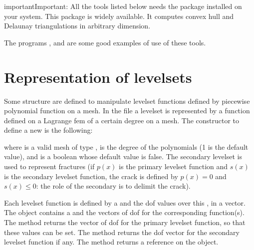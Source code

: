 \documentclass[a4paper,11pt,english]{sphinxmanual}
\begin{document}
\begin{sphinxadmonition}{important}{Important:}
All the tools listed below needs the package 
installed on your system. This package is widely available.
It computes convex hull and Delaunay triangulations in arbitrary dimension.
\end{sphinxadmonition}

The programs ,  and  are some good examples of use of these tools.


\section{Representation of level\sphinxhyphen{}sets}
\label{\detokenize{userdoc/xfem:representation-of-level-sets}}
Some structure are defined to manipulate level\sphinxhyphen{}set functions defined by
piecewise polynomial function on a mesh. In the file
 a level\sphinxhyphen{}set is represented by a
function defined on a Lagrange fem of a certain degree on a mesh.
The constructor to define a new  is the following:

\begin{sphinxVerbatim}[commandchars=\\\{\}]
       
\end{sphinxVerbatim}

where  is a valid mesh of type ,  is the degree of the
polynomials (1 is the default value), and  is a boolean whose
default value is false. The secondary level\sphinxhyphen{}set is used to represent
fractures (if \(p(x)\) is the primary level\sphinxhyphen{}set function and
\(s(x)\) is the secondary level\sphinxhyphen{}set function, the crack is defined
by \(p(x) = 0\) and \(s(x) \leq 0\): the role of the secondary
is to delimit the crack).

Each level\sphinxhyphen{}set function is defined by a   and the dof values
over this , in a vector. The object  contains a  and the
vectors of dof for the corresponding function(s). The method
 returns the vector of dof for the primary level\sphinxhyphen{}set
function, so that these values can be set. The method 
returns the dof vector for the secondary level\sphinxhyphen{}set function if any.
The method  returns a reference on the  object.
\end{document}
